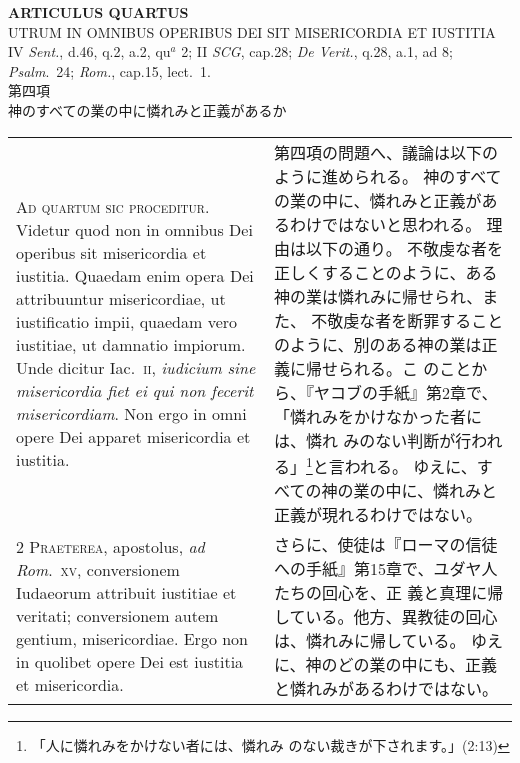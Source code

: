 \documentclass[10pt]{jsarticle} %
\begin{document}
{\begin{longtable}{p{21em}p{21em}}
\end{longtable}
\newpage





\begin{center}
 {\Large {\bf ARTICULUS QUARTUS}}\\
 {\large UTRUM IN OMNIBUS OPERIBUS DEI SIT MISERICORDIA ET IUSTITIA}\\
 {\footnotesize IV {\itshape Sent.}, d.46, q.2, a.2, qu$^a$ 2; II
 {\itshape SCG}, cap.28; {\itshape De Verit.}, q.28, a.1, ad 8;
 {\itshape Psalm}.~24; {\itshape Rom.}, cap.15, lect.~1.}\\
 {\Large 第四項\\神のすべての業の中に憐れみと正義があるか}
\end{center}

\begin{longtable}{p{21em}p{21em}}

{\Huge A}{\scshape d quartum sic proceditur}. Videtur quod non
in omnibus Dei operibus sit misericordia et iustitia. Quaedam enim opera
Dei attribuuntur misericordiae, ut iustificatio impii, quaedam vero
iustitiae, ut damnatio impiorum. Unde dicitur Iac.~{\scshape ii}, {\itshape iudicium sine
misericordia fiet ei qui non fecerit misericordiam}. Non ergo in omni
opere Dei apparet misericordia et iustitia.


&

第四項の問題へ、議論は以下のように進められる。
神のすべての業の中に、憐れみと正義があるわけではないと思われる。
理由は以下の通り。
不敬虔な者を正しくすることのように、ある神の業は憐れみに帰せられ、また、
 不敬虔な者を断罪することのように、別のある神の業は正義に帰せられる。こ
 のことから、『ヤコブの手紙』第2章で、「憐れみをかけなかった者には、憐れ
 みのない判断が行われる」\footnote{「人に憐れみをかけない者には、憐れみ
 のない裁きが下されます。」(2:13)}と言われる。
ゆえに、すべての神の業の中に、憐れみと正義が現れるわけではない。

\\


{\scshape 2 Praeterea}, apostolus, {\itshape ad Rom}.~{\scshape xv},
conversionem Iudaeorum attribuit iustitiae et veritati; conversionem
autem gentium, misericordiae. Ergo non in quolibet opere Dei est
iustitia et misericordia.


&

さらに、使徒は『ローマの信徒への手紙』第15章で、ユダヤ人たちの回心を、正
 義と真理に帰している。他方、異教徒の回心は、憐れみに帰している。
ゆえに、神のどの業の中にも、正義と憐れみがあるわけではない。



\end{longtable}}
\end{document}
